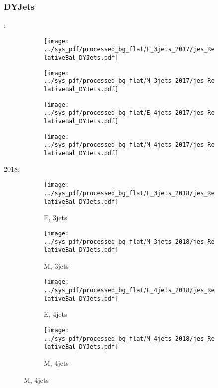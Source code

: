 \documentclass{beamer}
\begin{document}
\begin{frame}
\frametitle{DYJets}
\fontsize{5}{1}:
\begin{figure}
\centering
\begin{subfigure}[b]{0.24\textwidth}
\texttt{[image: ../sys\_pdf/processed\_bg\_flat/E\_3jets\_2017/jes\_RelativeBal\_DYJets.pdf]}
\end{subfigure}
\begin{subfigure}[b]{0.24\textwidth}
\texttt{[image: ../sys\_pdf/processed\_bg\_flat/M\_3jets\_2017/jes\_RelativeBal\_DYJets.pdf]}
\end{subfigure}
\begin{subfigure}[b]{0.24\textwidth}
\texttt{[image: ../sys\_pdf/processed\_bg\_flat/E\_4jets\_2017/jes\_RelativeBal\_DYJets.pdf]}
\end{subfigure}
\begin{subfigure}[b]{0.24\textwidth}
\texttt{[image: ../sys\_pdf/processed\_bg\_flat/M\_4jets\_2017/jes\_RelativeBal\_DYJets.pdf]}
\end{subfigure}
\end{figure}
2018:
\begin{figure}
\centering
\begin{subfigure}[b]{0.24\textwidth}
\texttt{[image: ../sys\_pdf/processed\_bg\_flat/E\_3jets\_2018/jes\_RelativeBal\_DYJets.pdf]}
\captionsetup{font=tiny}
\caption{E, 3jets}
\end{subfigure}
\begin{subfigure}[b]{0.24\textwidth}
\texttt{[image: ../sys\_pdf/processed\_bg\_flat/M\_3jets\_2018/jes\_RelativeBal\_DYJets.pdf]}
\captionsetup{font=tiny}
\caption{M, 3jets}
\end{subfigure}
\begin{subfigure}[b]{0.24\textwidth}
\texttt{[image: ../sys\_pdf/processed\_bg\_flat/E\_4jets\_2018/jes\_RelativeBal\_DYJets.pdf]}
\captionsetup{font=tiny}
\caption{E, 4jets}
\end{subfigure}
\begin{subfigure}[b]{0.24\textwidth}
\texttt{[image: ../sys\_pdf/processed\_bg\_flat/M\_4jets\_2018/jes\_RelativeBal\_DYJets.pdf]}
\captionsetup{font=tiny}
\caption{M, 4jets}
\end{subfigure}
\end{figure}
\end{frame}
\end{document}
